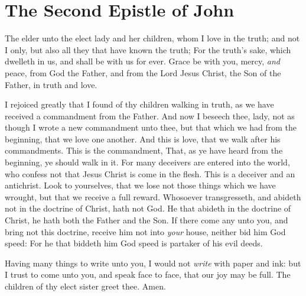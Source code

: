 \documentclass[11pt,letterpaper,oneside]{memoir}
\begin{document}
\chapter[2 John]{The Second Epistle of John}
The elder unto the elect lady and her children, whom I love in the
truth; and not I only, but also all they that have known the truth; For
the truth's sake, which dwelleth in us, and shall be with us for ever.
Grace be with you, mercy, \emph{and} peace, from God the Father, and
from the Lord Jesus Christ, the Son of the Father, in truth and love.

I rejoiced greatly that I found of thy children walking in truth, as we
have received a commandment from the Father. And now I beseech thee,
lady, not as though I wrote a new commandment unto thee, but that which
we had from the beginning, that we love one another. And this is love,
that we walk after his commandments. This is the commandment, That, as
ye have heard from the beginning, ye should walk in it. For many
deceivers are entered into the world, who confess not that Jesus Christ
is come in the flesh. This is a deceiver and an antichrist. Look to
yourselves, that we lose not those things which we have wrought, but
that we receive a full reward. Whosoever transgresseth, and abideth not
in the doctrine of Christ, hath not God. He that abideth in the doctrine
of Christ, he hath both the Father and the Son. If there come any unto
you, and bring not this doctrine, receive him not into \emph{your}
house, neither bid him God speed: For he that biddeth him God speed is
partaker of his evil deeds.

Having many things to write unto you, I would not \emph{write} with
paper and ink: but I trust to come unto you, and speak face to face,
that our joy may be full. The children of thy elect sister greet thee.
Amen.
\end{document}
